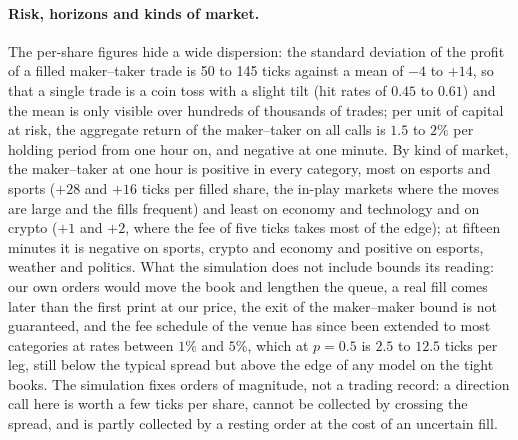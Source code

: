 \paragraph{Risk, horizons and kinds of market.}  The per-share figures hide a wide
dispersion: the standard deviation of the profit of a filled maker--taker trade is 50 to 145
ticks against a mean of $-4$ to $+14$, so that a single trade is a coin toss with a slight
tilt (hit rates of $0.45$ to $0.61$) and the mean is only visible over hundreds of thousands
of trades; per unit of capital at risk, the aggregate return of the maker--taker on all
calls is $1.5$ to $2\%$ per holding period from one hour on, and negative at one minute.
By kind of market, the maker--taker at one hour is positive in every category, most on esports and sports
($+28$ and $+16$ ticks per filled share, the in-play markets where the moves are large and
the fills frequent) and least on economy and technology and on crypto ($+1$ and $+2$, where
the fee of five ticks takes most of the edge); at fifteen minutes it is negative on sports,
crypto and economy and positive on esports, weather and politics.  What the simulation does
not include bounds its reading: our own orders would move the book and lengthen the queue,
a real fill comes later than the first print at our price, the exit of the maker--maker
bound is not guaranteed, and the fee schedule of the venue has since been extended to most
categories at rates between $1\%$ and $5\%$, which at $p = 0.5$ is $2.5$ to $12.5$ ticks per
leg, still below the typical spread but above the edge of any model on the tight books.
The simulation fixes orders of magnitude, not a trading record: a direction call here is
worth a few ticks per share, cannot be collected by crossing the spread, and is partly
collected by a resting order at the cost of an uncertain fill.
